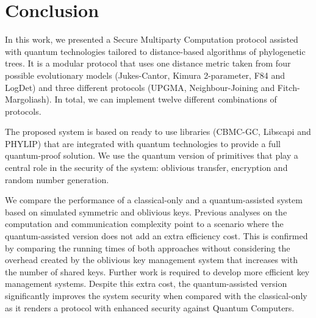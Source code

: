 


\section{Conclusion}

In this work, we presented a Secure Multiparty Computation protocol assisted with quantum technologies tailored to distance-based algorithms of phylogenetic trees. It is a modular protocol that uses one distance metric taken from four possible evolutionary models (Jukes-Cantor, Kimura 2-parameter, F84 and LogDet) and three different protocols (UPGMA, Neighbour-Joining and Fitch-Margoliash). In total, we can implement twelve different combinations of protocols.

The proposed system is based on ready to use libraries (CBMC-GC, Libscapi and PHYLIP) that are integrated with quantum technologies to provide a full quantum-proof solution. We use the quantum version of primitives that play a central role in the security of the system: oblivious transfer, encryption and random number generation.

We compare the performance of a classical-only and a quantum-assisted system based on simulated symmetric and oblivious keys. Previous analyses on the computation and communication complexity point to a scenario where the quantum-assisted version does not add an extra efficiency cost. This is confirmed by comparing the running times of both approaches without considering the overhead created by the oblivious key management system that increases with the number of shared keys. Further work is required to develop more efficient key management systems. Despite this extra cost, the quantum-assisted version significantly improves the system security when compared with the classical-only as it renders a protocol with enhanced security against Quantum Computers.








%
%
%
